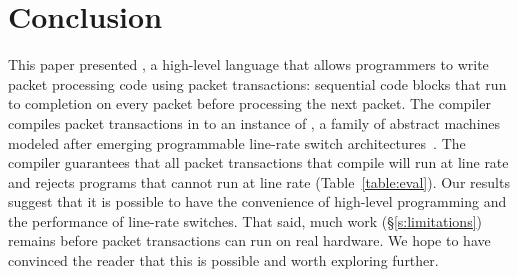 \section{Conclusion}
\label{s:conclusion}

This paper presented \pktlanguage, a high-level language that allows
programmers to write packet processing code using packet transactions:
sequential code blocks that run to completion on every packet before processing
the next packet. The \pktlanguage compiler compiles packet transactions in
\pktlanguage to an instance of \absmachine, a family of abstract machines
modeled after emerging programmable line-rate switch
architectures~\cite{flexpipe, xpliant, rmt}. The compiler guarantees that all
packet transactions that compile will run at line rate and rejects \pktlanguage
programs that cannot run at line rate (Table~\ref{table:eval}). Our results
suggest that it is possible to have the convenience of high-level programming
and the performance of line-rate switches. That said, much work
(\S\ref{s:limitations}) remains before packet transactions can run on real
hardware. We hope to have convinced the reader that this is possible and
worth exploring further.
